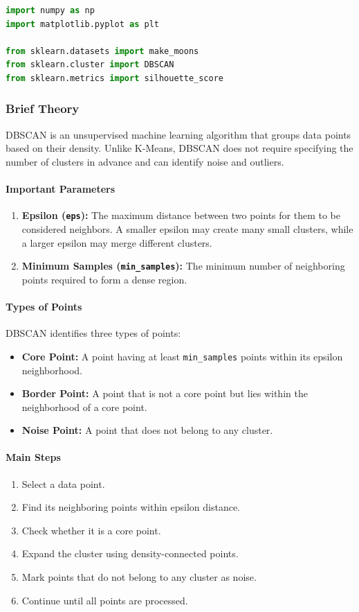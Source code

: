 \documentclass[a4paper,11pt]{article}
\begin{document}
\begin{lstlisting}[language=Python, caption={Required Imports}]
import numpy as np
import matplotlib.pyplot as plt

from sklearn.datasets import make_moons
from sklearn.cluster import DBSCAN
from sklearn.metrics import silhouette_score
\end{lstlisting}

\subsubsection{Brief Theory}
DBSCAN is an unsupervised machine learning algorithm that groups data points based on their density. Unlike K-Means, DBSCAN does not require specifying the number of clusters in advance and can identify noise and outliers.

\paragraph{Important Parameters}
\begin{enumerate}
    \item \textbf{Epsilon (\texttt{eps}):} The maximum distance between two points for them to be considered neighbors. A smaller epsilon may create many small clusters, while a larger epsilon may merge different clusters.
    \item \textbf{Minimum Samples (\texttt{min\_samples}):} The minimum number of neighboring points required to form a dense region.
\end{enumerate}

\paragraph{Types of Points}
DBSCAN identifies three types of points:
\begin{itemize}
    \item \textbf{Core Point:} A point having at least \texttt{min\_samples} points within its epsilon neighborhood.
    \item \textbf{Border Point:} A point that is not a core point but lies within the neighborhood of a core point.
    \item \textbf{Noise Point:} A point that does not belong to any cluster.
\end{itemize}

\paragraph{Main Steps}
\begin{enumerate}
    \item Select a data point.
    \item Find its neighboring points within epsilon distance.
    \item Check whether it is a core point.
    \item Expand the cluster using density-connected points.
    \item Mark points that do not belong to any cluster as noise.
    \item Continue until all points are processed.
\end{enumerate}
\end{document}
